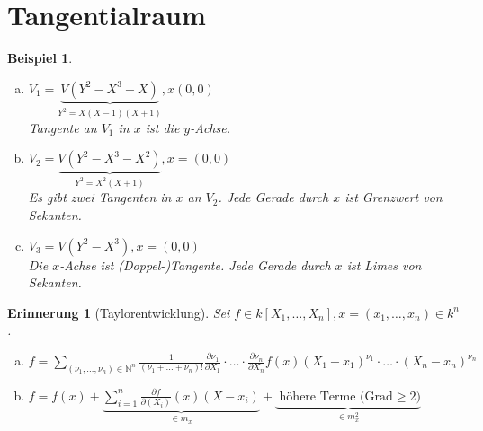 \documentclass[a4paper,12pt]{report}
\theoremstyle{break}
\newtheorem{Erinn}[Def]{Erinnerung}
\newtheorem{Bsp}[Def]{Beispiel}
\theoremstyle{nonumberbreak}
\theoremstyle{nonumberplain}
\newcommand{\quot}[1]{\textrm{\glqq}{#1}\textrm{\grqq}}
\newcommand{\N}{\mathbb{N}}
\begin{document}
\newpage


\section{Tangentialraum}

\begin{Bsp}\begin{enumerate}[a)] %
\item
	$V_1=\underbrace{V(Y^2-X^3+X)}_{Y^2=X(X-1)(X+1)}, x(0,0)$\\
	Tangente an $V_1$ in $x$ \quot{ist} die $y$-Achse.
\item
	$V_2=\underbrace{V(Y^2-X^3-X^2)}_{Y^2=X^2(X+1)}, x=(0,0)$\\
	Es gibt zwei Tangenten in $x$ an $V_2$. Jede Gerade durch $x$ ist Grenzwert von Sekanten.
\item
	$V_3=V(Y^2-X^3), x=(0,0)$\\
	Die $x$-Achse ist (Doppel-)Tangente. Jede Gerade durch $x$ ist Limes von Sekanten.
\end{enumerate}\end{Bsp}

\begin{Erinn}[Taylorentwicklung]
Sei $f\in k[X_1,\ldots ,X_n], x=(x_1,\ldots ,x_n)\in k^n$.\begin{enumerate}[a)]
\item
	$f=\sum\limits_{(\nu_1,\ldots ,\nu_n)\in \N^n} \frac{1}{(\nu_1+\ldots +\nu_n)!}\frac{\partial\nu_1}{\partial X_1}\cdot\ldots \cdot \frac{\partial\nu_n}{\partial X_n} f(x)(X_1-x_1)^{\nu_1}\cdot\ldots \cdot(X_n-x_n)^{\nu_n}$
\item
	$f=f(x)+ \underbrace{\sum\limits_{i=1}^n\frac{\partial f}{\partial(X_i)}(x)(X-x_i)}_{\in m_x} + \underbrace{\text{ h\"ohere Terme (Grad} \ge2)}_{\in m_x^2}$
\end{enumerate}\end{Erinn}
\end{document}
